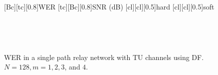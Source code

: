 \begin{figure}
    [Bc][tc][0.8]{WER}
    [tc][Bc][0.8]{SNR (dB)}
    [cl][cl][0.5]{hard}
    [cl][cl][0.5]{soft}

\centerline{
	 \\
}
\centerline{
	 \\
}
\caption{WER in a single path relay network with TU channels using DF.  $N = 128, m = 1, 2, 3$, and $4$.}
\label{fig:sp_df_wer_plots_TU}
\end{figure}

